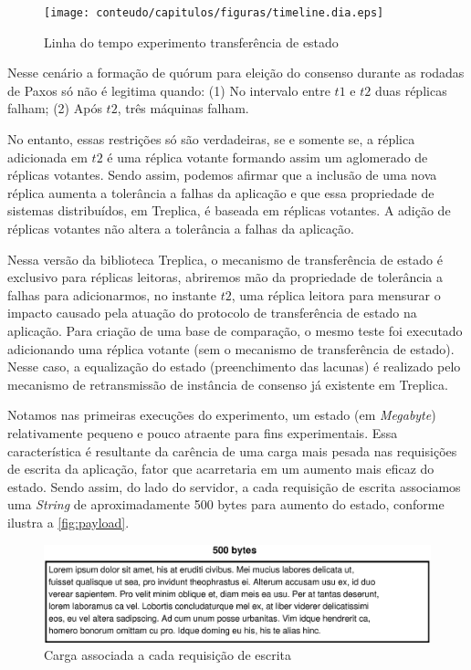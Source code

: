\begin{figure}[ht]
  \centering
  \texttt{[image: conteudo/capitulos/figuras/timeline.dia.eps]}
  \caption{Linha do tempo experimento transferência de estado}
  \label{fig:timeline}
\end{figure}

Nesse cenário a formação de quórum para eleição do consenso durante as rodadas de Paxos só
não é legitima quando: (1) No intervalo entre $t1$ e $t2$ duas réplicas falham; (2) Após
$t2$, três máquinas falham.

No entanto, essas restrições só são verdadeiras, se e somente se, a réplica adicionada em
$t2$ é uma réplica votante formando assim um aglomerado de réplicas votantes. Sendo assim,
podemos afirmar que a inclusão de uma nova réplica aumenta a tolerância a falhas da
aplicação e que essa propriedade de sistemas distribuídos, em Treplica, é baseada em
réplicas votantes. A adição de réplicas votantes não altera a tolerância a falhas da
aplicação.

Nessa versão da biblioteca Treplica, o mecanismo de transferência de estado é exclusivo
para réplicas leitoras, abriremos mão da propriedade de tolerância a falhas para
adicionarmos, no instante $t2$, uma réplica leitora para mensurar o impacto causado pela
atuação do protocolo de transferência de estado na aplicação. Para criação de uma base de
comparação, o mesmo teste foi executado adicionando uma réplica votante (sem o mecanismo
de transferência de estado). Nesse caso, a equalização do estado (preenchimento das
lacunas) é realizado pelo mecanismo de retransmissão de instância de consenso já existente
em Treplica.

Notamos nas primeiras execuções do experimento, um estado (em \emph{Megabyte})
relativamente pequeno e pouco atraente para fins experimentais. Essa característica é
resultante da carência de uma carga mais pesada nas requisições de escrita da aplicação,
fator que acarretaria em um aumento mais eficaz do estado. Sendo assim, do lado do
servidor, a cada requisição de escrita associamos uma \emph{String} de aproximadamente 500
bytes para aumento do estado, conforme ilustra a \autoref{fig:payload}.

\begin{figure}[ht]
  \centering
  \includegraphics[width=12cm]{conteudo/capitulos/figuras/payload.dia.eps}
  \caption{Carga associada a cada requisição de escrita}
  \label{fig:payload}
\end{figure}

